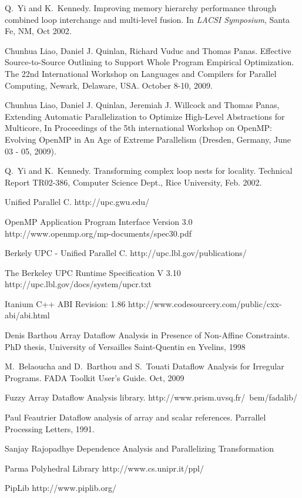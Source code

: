 \begin{thebibliography}{WW}
Q.~Yi and K.~Kennedy.
\newblock Improving memory hierarchy performance through combined loop
  interchange and multi-level fusion.
\newblock In {\em LACSI Symposium}, Santa Fe, NM, Oct 2002.

Chunhua Liao, Daniel J. Quinlan, Richard Vuduc and Thomas Panas.
\newblock Effective Source-to-Source Outlining to Support Whole Program
Empirical Optimization.
\newblock The 22nd International Workshop on Languages and Compilers for Parallel Computing, Newark, Delaware, USA. October 8-10, 2009.

Chunhua Liao, Daniel J. Quinlan, Jeremiah J. Willcock and Thomas Panas,
\newblock Extending Automatic Parallelization to Optimize High-Level
Abstractions for Multicore,
\newblock In Proceedings of the 5th international Workshop on OpenMP:
Evolving OpenMP in An Age of Extreme Parallelism (Dresden, Germany, June 03
- 05, 2009).


Q.~Yi and K.~Kennedy.
\newblock Transforming complex loop nests for locality.
\newblock Technical Report TR02-386, Computer Science Dept., Rice University,
  Feb. 2002.

\newblock Unified Parallel C.
\newblock http://upc.gwu.edu/

\newblock OpenMP Application Program Interface Version 3.0
\newblock http://www.openmp.org/mp-documents/spec30.pdf

\newblock Berkely UPC - Unified Parallel C.
\newblock http://upc.lbl.gov/publications/

\newblock The Berkeley UPC Runtime Specification V 3.10
\newblock http://upc.lbl.gov/docs/system/upcr.txt

\newblock Itanium C++ ABI Revision: 1.86
\newblock http://www.codesourcery.com/public/cxx-abi/abi.html

Denis Barthou
\newblock Array Dataflow Analysis in Presence of Non-Affine Constraints.
\newblock PhD thesis, University of Versailles Saint-Quentin en Yvelins, 1998

M.~Belaoucha and D.~Barthou and S.~Touati
\newblock Dataflow Analysis for Irregular Programs. FADA Toolkit User's Guide. Oct, 2009

Fuzzy Array Dataflow Analysis library.
\newblock http://www.prism.uvsq.fr/~bem/fadalib/

Paul Feautrier
\newblock Dataflow analysis of array and scalar references.
\newblock Parrallel Processing Letters, 1991.

Sanjay Rajopadhye
\newblock Dependence Analysis and Parallelizing Transformation

Parma Polyhedral Library
\newblock http://www.cs.unipr.it/ppl/

PipLib
\newblock http://www.piplib.org/

\end{thebibliography}





